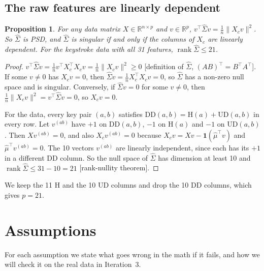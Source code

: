 \documentclass[11pt]{article}
\newcommand{\R}{\mathbb{R}}
\newcommand{\one}{\mathbf{1}}
\newcommand{\T}{^{\top}}
\newcommand{\hSigma}{\hat{\Sigma}}
\newcommand{\hmu}{\hat{\mu}}
\newcommand{\norm}[1]{\lVert #1\rVert}
\theoremstyle{plain}
\newtheorem{proposition}{Proposition}
\theoremstyle{definition}
\theoremstyle{remark}
\begin{document}
\subsection{The raw features are linearly dependent}
\begin{proposition}\label{prop:singular}
For any data matrix $X\in\R^{n\times p}$ and $v\in\R^p$,
$v\T\hSigma v=\frac1n\norm{X_cv}^2$. So $\hSigma$ is PSD, and $\hSigma$ is singular
if and only if the columns of $X_c$ are linearly dependent. For the keystroke data
with all 31 features, $\operatorname{rank}\hSigma\le21$.
\end{proposition}
\begin{proof}
$v\T\hSigma v=\frac1n v\T X_c\T X_cv=\frac1n\norm{X_cv}^2\ge0$ [definition of
$\hSigma$, $(AB)\T=B\T A\T$]. If some $v\ne0$ has $X_cv=0$, then
$\hSigma v=\frac1nX_c\T X_cv=0$, so $\hSigma$ has a non-zero null space and is
singular. Conversely, if $\hSigma v=0$ for some $v\ne0$, then
$\frac1n\norm{X_cv}^2=v\T\hSigma v=0$, so $X_cv=0$.

For the data, every key pair $(a,b)$ satisfies
$\mathrm{DD}(a,b)=\mathrm{H}(a)+\mathrm{UD}(a,b)$ in every row. Let $v^{(ab)}$
have $+1$ on $\mathrm{DD}(a,b)$, $-1$ on $\mathrm{H}(a)$ and $-1$ on
$\mathrm{UD}(a,b)$. Then $Xv^{(ab)}=0$, and also $X_cv^{(ab)}=0$ because
$X_cv=Xv-\one(\hmu\T v)$ and $\hmu\T v^{(ab)}=0$. The 10 vectors $v^{(ab)}$ are
linearly independent, since each has its $+1$ in a different DD column. So the null
space of $\hSigma$ has dimension at least 10 and
$\operatorname{rank}\hSigma\le31-10=21$ [rank-nullity theorem].
\end{proof}

We keep the 11 H and the 10 UD columns and drop the 10 DD columns, which gives $p=21$.

\section{Assumptions}\label{sec:assump}
For each assumption we state what goes wrong in the math if it fails, and how we
will check it on the real data in Iteration~3.
\end{document}
